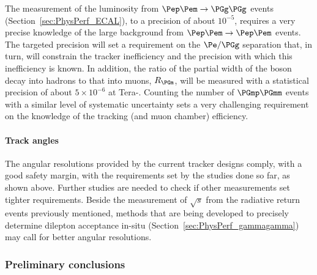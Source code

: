 The measurement of the luminosity from $\epem \to \PGg \PGg$ events (Section~\ref{sec:PhysPerf_ECAL}), to a precision of about $10^{-5}$, 
requires a very precise knowledge of the large background from $\epem \to \epem$ events. 
The targeted precision will set a requirement on the $\Pe / \PGg$ separation that, in turn, 
will constrain the tracker inefficiency and the precision with which this inefficiency is known. 
In addition, the ratio of the partial width of the \PZ boson decay into hadrons to that into muons, $R_{\PGm}$, 
will be measured with a statistical precision of about $5 \times 10^{-6}$ at Tera-\PZ. 
Counting the number of $\PGmp\PGmm$ events with a similar level of systematic uncertainty 
sets a very challenging requirement on the knowledge of the tracking (and muon chamber) efficiency.   

\paragraph{Track angles}
The angular resolutions provided by the current tracker designs comply, with a good safety margin, with the requirements set by the studies done so far, as shown above. 
Further studies are needed to check if other measurements set tighter requirements. 
Beside the measurement of $\sqrt{s}$ from the radiative return events previously mentioned, 
methods that are being developed to precisely determine dilepton acceptance in-situ (Section~\ref{sec:PhysPerf_gammagamma}) may call for better angular resolutions. 

\subsubsection{Preliminary conclusions}

